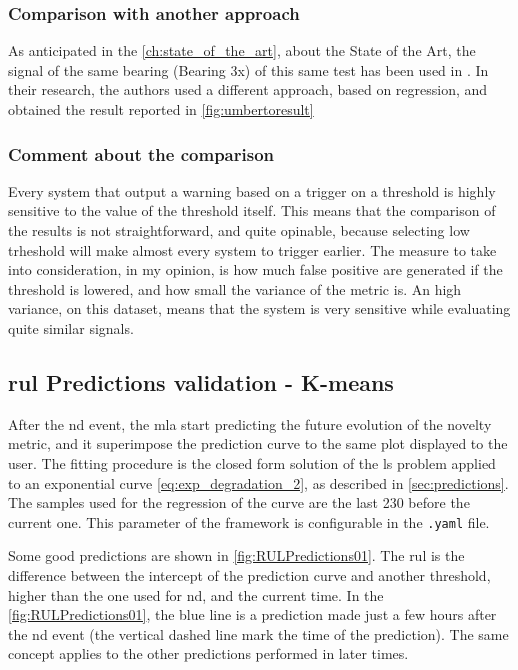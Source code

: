 \subsubsection{Comparison with another approach}
As anticipated in the \autoref{ch:state_of_the_art}, about the State of the Art, the signal of the same bearing (Bearing 3x) of this same test has been used in \cite{Umberto}. In their research, the authors used a different approach, based on regression, and obtained the result reported in \autoref{fig:umbertoresult}


\subsubsection{Comment about the comparison}
Every system that output a warning based on a trigger on a threshold is highly sensitive to the value of the threshold itself. This means that the comparison of the results is not straightforward, and quite opinable, because selecting low trheshold will make almost every system to trigger earlier. The measure to take into consideration, in my opinion, is how much false positive are generated if the threshold is lowered, and how small the variance of the metric is. An high variance, on this dataset, means that the system is very sensitive while evaluating quite similar signals.

\subsection{\gls{rul} Predictions validation - K-means}
After the \gls{nd} event, the \gls{mla} start predicting the future evolution of the novelty metric, and it superimpose the prediction curve to the same plot displayed to the user. The fitting procedure is the closed form solution of the \gls{ls} problem applied to an exponential curve \autoref{eq:exp_degradation_2}, as described in \autoref{sec:predictions}. The samples used for the regression of the curve are the last 230 before the current one. This parameter of the framework is configurable in the \texttt{.yaml} file. 

Some good predictions are shown in \autoref{fig:RULPredictions01}. The \gls{rul} is the difference between the intercept of the prediction curve and another threshold, higher than the one used for \gls{nd}, and the current time. In the \autoref{fig:RULPredictions01}, the blue line is a prediction made just a few hours after the \gls{nd} event (the vertical dashed line mark the time of the prediction). The same concept applies to the other predictions performed in later times.

